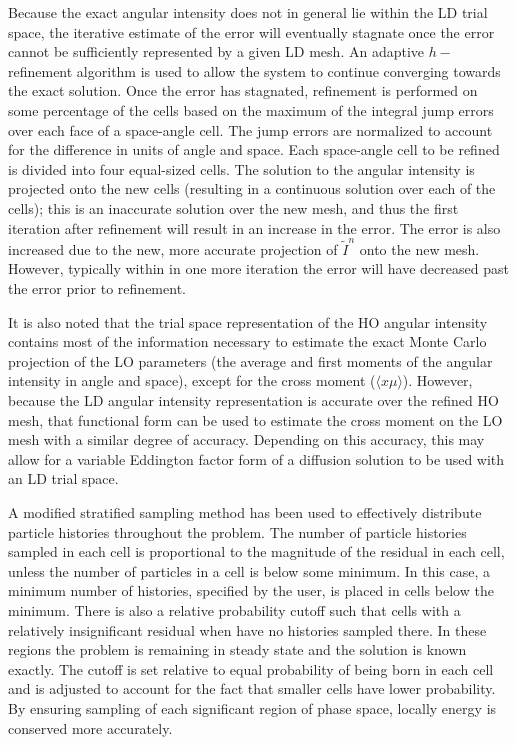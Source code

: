 \documentclass{mc2013}
\begin{document}
Because the exact angular intensity does not in general lie within the LD trial space, the
iterative estimate of the error will eventually stagnate once the error cannot be sufficiently
represented by a given LD mesh.  An adaptive $h-$refinement algorithm is used
to allow the system to continue converging towards the exact solution.  Once the
error has stagnated, refinement is performed on some percentage of the cells
based on the maximum of the integral jump errors over each face of a space-angle cell.  The
jump errors are normalized to account for the difference in units of angle and
space.  Each space-angle cell to be refined is divided into four equal-sized cells.
The solution to the angular intensity is projected onto the new cells (resulting in
a continuous solution over each of the cells); this is an inaccurate solution over
the new mesh, and thus the first iteration after refinement will result in an
increase in the error.  The error is also increased due to the new, more accurate projection of $\tilde I^n$ onto the new mesh.  However, typically within in one more iteration the error
will have decreased past the error prior to refinement.  

 It is also noted that the trial space
representation of the HO angular intensity contains most of the information necessary to
estimate the exact Monte Carlo projection of the LO parameters (the average and first moments of the angular intensity
in angle and space), except for the cross moment ($\langle x \mu \rangle$).  However,
because the LD angular intensity representation is accurate over the refined HO mesh, that
functional form can be used to estimate the cross moment on the LO mesh with a
similar degree of accuracy.  Depending on this accuracy, this may allow for a variable
Eddington factor form of a diffusion solution to be used with an LD trial space.


A modified stratified sampling method has been used to effectively distribute particle
histories throughout the problem.  The number of particle histories sampled in each cell is proportional to the magnitude of the residual in each cell, unless the number of particles in a cell is below some minimum. In this case, a minimum number of histories, specified by the user, is placed in cells below the minimum.  
There is also a relative probability cutoff such that cells with a relatively insignificant residual when have no histories sampled there. In these regions the problem is remaining in steady state and the solution is known exactly.  The cutoff is set relative to equal probability of being born in each cell and is
adjusted to account for the fact that smaller cells have lower probability.
By ensuring sampling of each significant region of phase space, locally
energy is conserved more accurately.    
\end{document}
